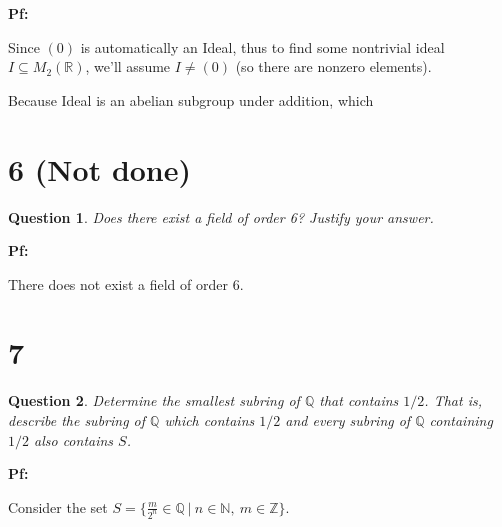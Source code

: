 \documentclass{article}
\newtheorem{question}{Question}
\begin{document}
\textbf{Pf:}

Since $(0)$ is automatically an Ideal, thus to find some nontrivial ideal $I\subseteq M_2(\mathbb{R})$, we'll assume $I\neq (0)$ (so there are nonzero elements).

\hfill

Because Ideal is an abelian subgroup under addition, which 

\break


\section*{6 (Not done)}
\begin{myBox}[]{}
    \begin{question}
        Does there exist a field of order 6? Justify your answer.
    \end{question}
\end{myBox}

\textbf{Pf:}

There does not exist a field of order $6$.

\break


\section*{7}
\begin{myBox}[]{}
    \begin{question}
        Determine the smallest subring of $\mathbb{Q}$ that contains $1/2$. That is, describe the subring
        of $\mathbb{Q}$ which contains $1/2$ and every subring of $\mathbb{Q}$ containing $1/2$ also contains $S$.
    \end{question}
\end{myBox}

\textbf{Pf:}

Consider the set $S=\{\frac{m}{2^n}\in\mathbb{Q}\ |\ n\in\mathbb{N},\ m\in\mathbb{Z}\}$.

\hfill
\end{document}
